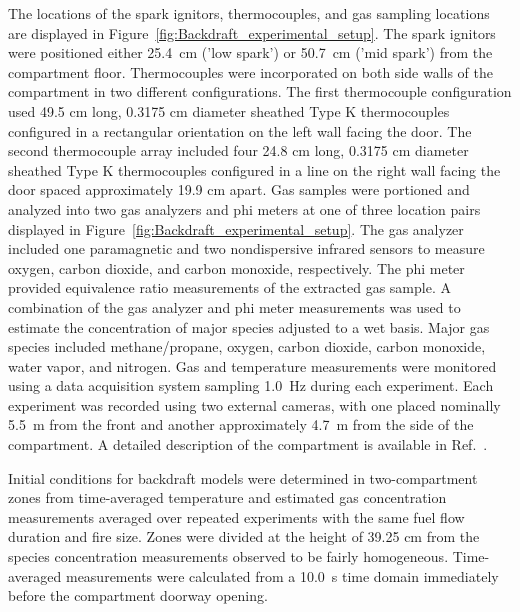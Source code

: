 \documentclass[12pt,letterpaper]{article}
\begin{document}
\begin{flushleft}
The locations of the spark ignitors, thermocouples, and gas sampling locations are displayed in Figure~\ref{fig:Backdraft_experimental_setup}. The spark ignitors were positioned either 25.4~cm ('low spark') or 50.7~cm ('mid spark') from the compartment floor. Thermocouples were incorporated on both side walls of the compartment in two different configurations. The first thermocouple configuration used 49.5 cm long, 0.3175 cm diameter sheathed Type K thermocouples configured in a rectangular orientation on the left wall facing the door. The second thermocouple array included four 24.8 cm long, 0.3175 cm diameter sheathed Type K thermocouples configured in a line on the right wall facing the door spaced approximately 19.9 cm apart. Gas samples were portioned and analyzed into two gas analyzers and phi meters at one of three location pairs displayed in Figure~\ref{fig:Backdraft_experimental_setup}. The gas analyzer included one paramagnetic and two nondispersive infrared sensors to measure oxygen, carbon dioxide, and carbon monoxide, respectively. The phi meter~\cite{babrauskas1994phi,Falkenstein2021a} provided equivalence ratio measurements of the extracted gas sample. A combination of the gas analyzer and phi meter measurements was used to estimate the concentration of major species adjusted to a wet basis. Major gas species included methane/propane, oxygen, carbon dioxide, carbon monoxide, water vapor, and nitrogen. Gas and temperature measurements were monitored using a data acquisition system sampling 1.0~Hz during each experiment. Each experiment was recorded using two external cameras, with one placed nominally 5.5~m from the front and another approximately 4.7~m from the side of the compartment. A detailed description of the compartment is available in Ref.~\cite{Brown2022}.

Initial conditions for backdraft models were determined in two-compartment zones from time-averaged temperature and estimated gas concentration measurements averaged over repeated experiments with the same fuel flow duration and fire size. Zones were divided at the height of 39.25 cm from the species concentration measurements observed to be fairly homogeneous. Time-averaged measurements were calculated from a 10.0~s time domain immediately before the compartment doorway opening. 


\end{flushleft}
\end{document}

